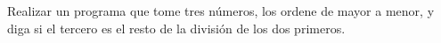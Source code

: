 Realizar un programa que tome tres números, los ordene de mayor a menor, y diga si el tercero es el resto de la división de los dos primeros. 